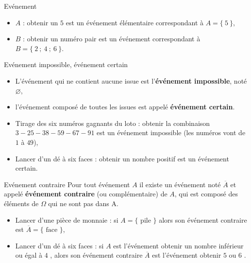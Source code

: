 \documentclass[10pt,a4paper,openany,twoside, prof]{book}
\begin{document}
\begin{ex}{Evénement}{}
   \begin{itemize}
      \item  $A$ : \og obtenir un $5$ \fg{} est un événement élémentaire correspondant à $A=\{~5~\}$,
      \item  $B$ : \og obtenir un numéro pair \fg{} est un événement correspondant à $B=\{~2~;~4~;~6~\}$.
   \end{itemize}
\end{ex}

\begin{defi}{Evénement impossible, événement certain}{}
   \begin{itemize}
      \item  L'événement qui ne contient aucune issue est l'\textbf{événement impossible}, noté $\varnothing$,
      \item  l'événement composé de toutes les issues est appelé \textbf{événement certain}.
   \end{itemize}
\end{defi}

\begin{ex}{}{}
   \begin{itemize}
      \item  Tirage des six numéros gagnants du loto : \og obtenir la combinaison $3-25-38-59-67-91$ \fg{} est un événement impossible (les numéros vont de $1$ à $49$),
      \item  Lancer d'un dé à six faces : \og obtenir un nombre positif \fg{} est un événement certain.
   \end{itemize}
\end{ex}

\begin{defi}{Evénement contraire}{}
   Pour tout événement $A$ il existe un événement noté $\overline{A}$ et appelé \textbf{événement contraire} (ou complémentaire) de $A$, qui est composé des éléments de $\Omega$ qui ne sont pas dans A.
\end{defi}

\begin{ex}{}{}
   \begin{itemize}
      \item  Lancer d'une pièce de monnaie : si $A=\{\text{~pile~}\}$ alors son événement contraire est $\overline{A}=\{\text{~face~}\}$,
      \item  Lancer d'un dé à six faces : si $A$ est l'événement \og obtenir un nombre inférieur ou égal à $4$ \fg{}, alors son événement contraire $\overline{A}$ est l'événement \og obtenir $5$ ou $6$ \fg{}.
   \end{itemize}
\end{ex}
\end{document}

